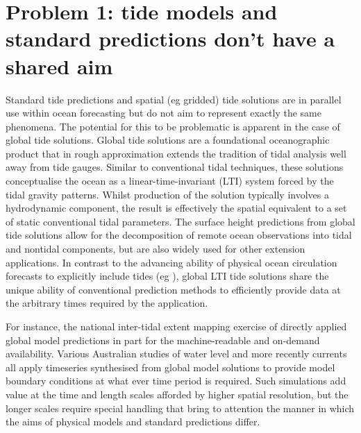 \section{Problem 1: tide models and standard predictions don't have a shared aim}
\label{Sec:OfficialGlobal}
Standard tide predictions and spatial (eg gridded) tide solutions are in parallel use within ocean forecasting but do not aim to represent exactly the same phenomena.    The potential for this to be problematic is apparent in the case of global tide solutions. 
Global tide solutions are a foundational oceanographic product that in rough approximation extends the tradition of tidal analysis well away from tide gauges.   Similar to conventional tidal techniques, these solutions conceptualise the ocean as a linear-time-invariant (LTI) system forced by the tidal gravity patterns. Whilst production of the solution typically involves a hydrodynamic component\citep{Egbert:2002ug}, the result is effectively the spatial equivalent to a set of static conventional tidal parameters.   The surface height predictions from global tide solutions allow for the decomposition of remote ocean observations into tidal and nontidal components, but are also widely used for other extension applications.
In contrast to the advancing ability of physical ocean circulation forecasts to explicitly include tides (eg \citep{10.1016/j.ocemod.2019.02.008}), global LTI tide solutions share the unique ability of conventional prediction methods to efficiently provide data at the arbitrary times required by the application.


For instance, the national inter-tidal extent mapping exercise of \citet{10.3390/rs10030480}  directly applied global model predictions in part for the machine-readable and on-demand availability.
Various Australian studies of water level \citep{Haigh:2013bn}\citep{Pattiaratchi2018} and more recently currents \citep{10.5194/os-2020-107} all apply timeseries synthesised from global model solutions to provide model boundary conditions at what ever time period is required.    Such simulations add value at the time and length scales afforded by higher spatial resolution, but the longer scales require special handling that bring to attention the manner in which the aims of physical models and standard predictions differ.

